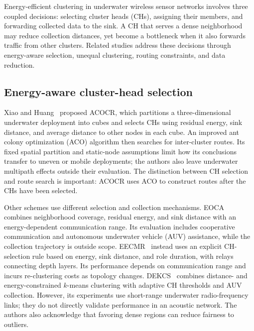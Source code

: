 \label{sec:related-works}

Energy-efficient clustering in underwater wireless sensor networks involves
three coupled decisions: selecting cluster heads (CHs), assigning their members,
and forwarding collected data to the sink. A CH that serves a dense neighborhood
may reduce collection distances, yet become a bottleneck when it also forwards
traffic from other clusters. Related studies address these decisions through
energy-aware selection, unequal clustering, routing constraints, and data
reduction.

\subsection{Energy-aware cluster-head selection}

Xiao and Huang~\cite{Xiao2020ACOCR} proposed ACOCR, which partitions a
three-dimensional underwater deployment into cubes and selects CHs using
residual energy, sink distance, and average distance to other nodes in each
cube. An improved ant colony optimization (ACO) algorithm then searches for
inter-cluster routes. Its fixed spatial partition and static-node assumptions
limit how its conclusions transfer to uneven or mobile deployments; the
authors also leave underwater multipath effects outside their evaluation.
The distinction between CH selection and route search is important: ACOCR
uses ACO to construct routes after the CHs have been selected.

Other schemes use different selection and collection mechanisms.
EOCA~\cite{Yu2020EOCA} combines neighborhood coverage, residual energy, and
sink distance with an energy-dependent communication range. Its evaluation
includes cooperative communication and autonomous underwater vehicle (AUV)
assistance, while the collection trajectory is outside scope.
EECMR~\cite{Nguyen2021EECMR} instead uses an explicit CH-selection rule based
on energy, sink distance, and role duration, with relays connecting depth
layers. Its performance depends on communication range and incurs
re-clustering costs as topology changes.
DEKCS~\cite{Omeke2021DEKCS} combines distance- and energy-constrained
$k$-means clustering with adaptive CH thresholds and AUV collection.
However, its experiments use short-range underwater radio-frequency links;
they do not directly validate performance in an acoustic network. The authors
also acknowledge that favoring dense regions can reduce fairness to outliers.

